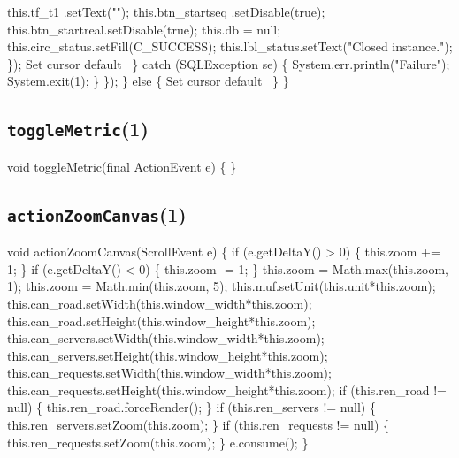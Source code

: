           this.tf_t1        .setText("");
          this.btn_startseq .setDisable(true);
          this.btn_startreal.setDisable(true);
          this.db = null;
          this.circ_status.setFill(C_SUCCESS);
          this.lbl_status.setText("Closed instance.");
        \});
        \LA{}Set cursor default~{\nwtagstyle{}}\RA{}
      \} catch (SQLException se) \{
        System.err.println("Failure");
        System.exit(1);
      \}
    \});
  \} else \{
    \LA{}Set cursor default~{\nwtagstyle{}}\RA{}
  \}
\}
\eatline
{}\nwendcode{}\nwdocspar
\subsection{\texttt{toggleMetric}(1)}
\nwenddocs{}\endmoddef{}
void toggleMetric(final ActionEvent e) \{
\}
\eatline
{}\nwendcode{}\nwdocspar
\subsection{\texttt{actionZoomCanvas}(1)}
\nwenddocs{}\endmoddef{}
void actionZoomCanvas(ScrollEvent e) \{
  if (e.getDeltaY() > 0) \{
    this.zoom += 1;
  \}
  if (e.getDeltaY() < 0) \{
    this.zoom -= 1;
  \}
  this.zoom = Math.max(this.zoom, 1);
  this.zoom = Math.min(this.zoom, 5);
  this.muf.setUnit(this.unit*this.zoom);
  this.can_road.setWidth(this.window_width*this.zoom);
  this.can_road.setHeight(this.window_height*this.zoom);
  this.can_servers.setWidth(this.window_width*this.zoom);
  this.can_servers.setHeight(this.window_height*this.zoom);
  this.can_requests.setWidth(this.window_width*this.zoom);
  this.can_requests.setHeight(this.window_height*this.zoom);
  if (this.ren_road != null) \{
    this.ren_road.forceRender();
  \}
  if (this.ren_servers != null) \{
    this.ren_servers.setZoom(this.zoom);
  \}
  if (this.ren_requests != null) \{
    this.ren_requests.setZoom(this.zoom);
  \}
  e.consume();
\}
\eatline
{}\nwendcode{}\nwdocspar
